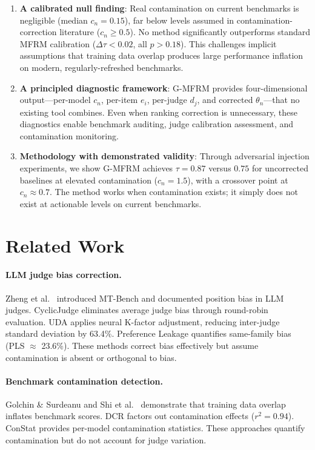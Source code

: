 \documentclass[11pt]{article}
\begin{document}
\begin{enumerate}
\item \textbf{A calibrated null finding}: Real contamination on current benchmarks is negligible (median $c_n = 0.15$), far below levels assumed in contamination-correction literature ($c_n \geq 0.5$). No method significantly outperforms standard MFRM calibration ($\Delta\tau < 0.02$, all $p > 0.18$). This challenges implicit assumptions that training data overlap produces large performance inflation on modern, regularly-refreshed benchmarks.

\item \textbf{A principled diagnostic framework}: G-MFRM provides four-dimensional output---per-model $c_n$, per-item $e_i$, per-judge $d_j$, and corrected $\theta_n$---that no existing tool combines. Even when ranking correction is unnecessary, these diagnostics enable benchmark auditing, judge calibration assessment, and contamination monitoring.

\item \textbf{Methodology with demonstrated validity}: Through adversarial injection experiments, we show G-MFRM achieves $\tau = 0.87$ versus $0.75$ for uncorrected baselines at elevated contamination ($c_n = 1.5$), with a crossover point at $c_n \approx 0.7$. The method works when contamination exists; it simply does not exist at actionable levels on current benchmarks.
\end{enumerate}

\section{Related Work}

\paragraph{LLM judge bias correction.}
Zheng et al.~\cite{zheng2023judging} introduced MT-Bench and documented position bias in LLM judges.
CyclicJudge \cite{li2024cyclicjudge} eliminates average judge bias through round-robin evaluation.
UDA \cite{huang2024uda} applies neural K-factor adjustment, reducing inter-judge standard deviation by 63.4\%.
Preference Leakage \cite{ryu2024prefleakage} quantifies same-family bias (PLS $\approx$ 23.6\%).
These methods correct bias effectively but assume contamination is absent or orthogonal to bias.

\paragraph{Benchmark contamination detection.}
Golchin \& Surdeanu \cite{golchin2023time} and Shi et al.~\cite{shi2023detecting} demonstrate that training data overlap inflates benchmark scores.
DCR \cite{yang2023dcr} factors out contamination effects ($r^2 = 0.94$).
ConStat \cite{dekoninck2024constat} provides per-model contamination statistics.
These approaches quantify contamination but do not account for judge variation.
\end{document}
